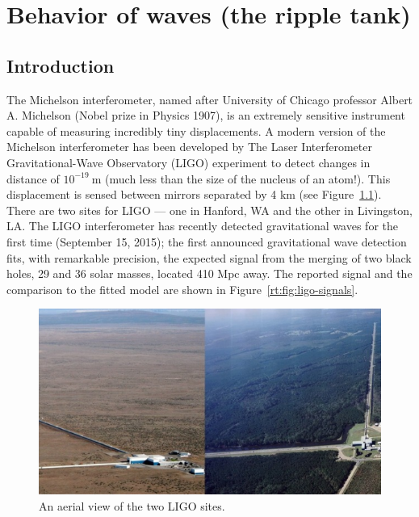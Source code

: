\chapter{Behavior of waves (the ripple tank)}\label{cha:ripple-tank}


\section{Introduction}

The Michelson interferometer, named after University of Chicago professor Albert A. Michelson (Nobel prize in Physics 1907), is an extremely sensitive instrument capable of measuring incredibly tiny displacements.
A modern version of the Michelson interferometer has been developed by The Laser Interferometer Gravitational-Wave Observatory (LIGO) experiment to detect changes in distance of $10^{-19}\:$m (much less than the size of the nucleus of an atom!).
This displacement is sensed between mirrors separated by 4 km (see Figure~\ref{rt:fig:ligo-aerial}). There are two sites for LIGO --- one in Hanford, WA and the other in Livingston, LA.
The LIGO interferometer has recently detected gravitational waves for the first time (September 15, 2015); the first announced gravitational wave detection fits, with remarkable precision, the expected signal from the merging of two black holes, 29 and 36 solar masses, located 410 Mpc away.
The reported signal and the comparison to the fitted model are shown in Figure~\ref{rt:fig:ligo-signals}.

\begin{figure}
	\includegraphics[width=\textwidth]{ripple-tank-remote/ligo-aerial.png}
	\caption{An aerial view of the two LIGO sites.}\label{rt:fig:ligo-aerial}
\end{figure}


